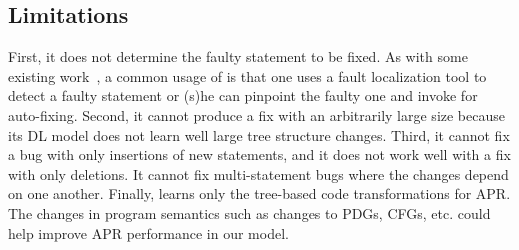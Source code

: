 \subsection{Limitations}
\label{sec:limitations}


First, it does not determine the faulty statement to be fixed. As with
some existing work~\cite{cure-icse21,lutellier2020coconut}, a common
usage of {\tool} is that one uses a fault localization tool to
detect a faulty statement or (s)he can pinpoint the faulty one and
invoke {\tool} for auto-fixing. Second, it cannot
produce a fix with an arbitrarily large size because its DL model does
not learn well large tree structure changes. Third, it cannot fix
a bug with only insertions of new statements, and it does not work
well with a fix with only deletions.
It cannot fix multi-statement bugs where the changes depend on one
another. Finally, {\tool} learns only the tree-based code
transformations for APR. The changes in program semantics such as
changes to PDGs, CFGs, etc. could help improve APR performance in our
model.

